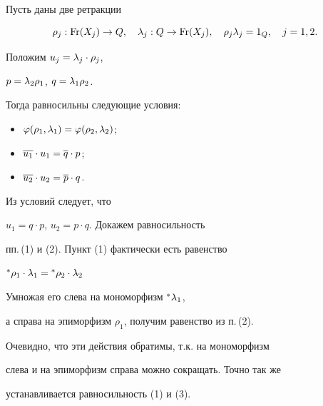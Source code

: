 \begin{lem}


Пусть даны две ретракции


$$


\rho_j:\Fr(X_j)\to Q, \quad \la_j: Q\to \Fr(X_j),\quad


\rho_j\la_j=1_Q,\quad j=1,2.


$$


Положим $u_j=\lambda_j\cdot\rho_j$,


$p=\lambda_2\rho_1 $, $ q=\lambda_1\rho_2$.


Тогда равносильны следующие условия:


\begin{itemize}


\item[(1)] $\varphi(\rho_1,\lambda_1)=\varphi(\rho_2,\lambda_2)$;


\item[(2)] $\overline{u_1}\cdot u_1=\overline{q}\cdot p$;


\item[(3)] $\overline{u_2}\cdot u_2=\overline{p}\cdot q$.


\end{itemize}


\end{lem}





\begin{pf} Из условий следует, что


$u_1=q\cdot p$, $u_2=p\cdot q$. Докажем равносильность


пп.\,(1) и (2). Пункт (1) фактически есть равенство


${}^{\ast}{\rho_1}\cdot\lambda_1={}^{\ast}{\rho_2}\cdot\lambda_2$


Умножая его слева на мономорфизм ${}^{\ast}{\lambda_1}$,


а справа на эпиморфизм $\rho_1$, получим равенство из п.\,(2).


Очевидно, что эти действия обратимы, т.к. на мономорфизм


слева и на эпиморфизм справа можно сокращать. Точно так же


устанавливается равносильность (1) и (3).


\end{pf}





